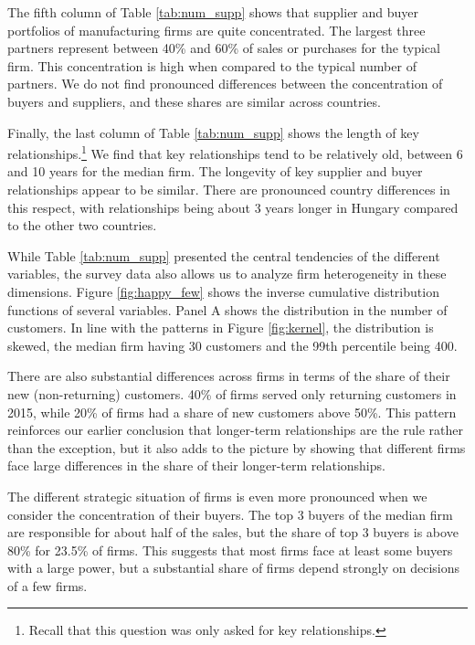 \usepackage{}\documentclass[final, dvipsnames, authoryear,12pt]{elsarticle}
\begin{document}
The fifth column of Table \ref{tab:num_supp} shows that supplier and buyer portfolios of manufacturing firms are quite concentrated. The largest three partners represent between 40\% and 60\% of sales or purchases for the typical firm. This concentration is high when compared to the typical number of partners. We do not find pronounced differences between the concentration of buyers and suppliers, and these shares are similar across countries.

Finally, the last column of Table \ref{tab:num_supp} shows the length of key relationships.\footnote{Recall that this question was only asked for key relationships.} We find that key relationships tend to be relatively old, between 6 and 10 years for the median firm. The longevity of key supplier and buyer relationships appear to be similar. There are pronounced country differences in this respect, with relationships being about 3 years longer in Hungary compared to the other two countries. 

While Table \ref{tab:num_supp} presented the central tendencies of the different variables, the survey data also allows us to analyze firm heterogeneity in these dimensions. Figure \ref{fig:happy_few} shows the inverse cumulative distribution functions of several variables. Panel A shows the distribution in the number of customers. In line with the patterns in Figure \ref{fig:kernel}, the distribution is skewed, the median firm having 30 customers and the 99th percentile being 400.

There are also substantial differences across firms in terms of the share of their new (non-returning) customers. 40\% of firms served only returning customers in 2015, while 20\% of firms had a share of new customers above 50\%. This pattern reinforces our earlier conclusion that longer-term relationships are the rule rather than the exception, but it also adds to the picture by showing that different firms face large differences in the share of their longer-term relationships.

The different strategic situation of firms is even more pronounced when we consider the concentration of their buyers. The top 3 buyers of the median firm are responsible for about half of the sales, but the share of top 3 buyers is above 80\% for 23.5\% of firms. This suggests that most firms face at least some buyers with a large power, but a substantial share of firms depend strongly on decisions of a few firms.
\end{document}
